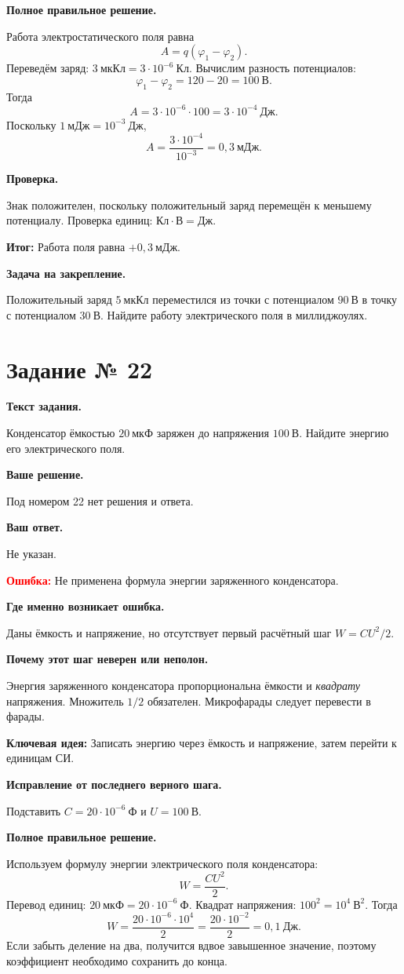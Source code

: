 \documentclass[11pt,a4paper]{article}
\newcommand{\reviewblock}[2]{\par\medskip\noindent\textbf{#1}\par\noindent#2\par}
\newcommand{\errorblock}[1]{\par\medskip\noindent\textcolor{red}{\textbf{Ошибка:}} #1\par}
\newcommand{\ideablock}[1]{\par\medskip\noindent\textcolor{blue!60!black}{\textbf{Ключевая идея:}} #1\par}
\newcommand{\resultblock}[1]{\par\medskip\noindent\textcolor{teal!60!black}{\textbf{Итог:}} #1\par}
\begin{document}
\reviewblock{Полное правильное решение.}{Работа электростатического поля равна
\[A=q(\varphi_1-\varphi_2).\]
Переведём заряд: $3\ \text{мкКл}=3\cdot10^{-6}\ \text{Кл}$. Вычислим разность потенциалов:
\[\varphi_1-\varphi_2=120-20=100\ \text{В}.\]
Тогда
\[A=3\cdot10^{-6}\cdot100=3\cdot10^{-4}\ \text{Дж}.\]
Поскольку $1\ \text{мДж}=10^{-3}\ \text{Дж}$,
\[A=\frac{3\cdot10^{-4}}{10^{-3}}=0{,}3\ \text{мДж}.\]}

\reviewblock{Проверка.}{Знак положителен, поскольку положительный заряд перемещён к меньшему потенциалу. Проверка единиц: $\text{Кл}\cdot\text{В}=\text{Дж}$.}

\resultblock{Работа поля равна $+0{,}3\ \text{мДж}$.}

\reviewblock{Задача на закрепление.}{Положительный заряд $5\ \text{мкКл}$ переместился из точки с потенциалом $90\ \text{В}$ в точку с потенциалом $30\ \text{В}$. Найдите работу электрического поля в миллиджоулях.}
\newpage
{}\label{task:22}

\section*{Задание № 22}

\reviewblock{Текст задания.}{Конденсатор ёмкостью $20\ \text{мкФ}$ заряжен до напряжения $100\ \text{В}$. Найдите энергию его электрического поля.}

\reviewblock{Ваше решение.}{Под номером 22 нет решения и ответа.}

\reviewblock{Ваш ответ.}{Не указан.}

\errorblock{Не применена формула энергии заряженного конденсатора.}

\reviewblock{Где именно возникает ошибка.}{Даны ёмкость и напряжение, но отсутствует первый расчётный шаг $W=CU^2/2$.}

\reviewblock{Почему этот шаг неверен или неполон.}{Энергия заряженного конденсатора пропорциональна ёмкости и \emph{квадрату} напряжения. Множитель $1/2$ обязателен. Микрофарады следует перевести в фарады.}

\ideablock{Записать энергию через ёмкость и напряжение, затем перейти к единицам СИ.}

\reviewblock{Исправление от последнего верного шага.}{Подставить $C=20\cdot10^{-6}\ \text{Ф}$ и $U=100\ \text{В}$.}

\reviewblock{Полное правильное решение.}{Используем формулу энергии электрического поля конденсатора:
\[W=\frac{CU^2}{2}.\]
Перевод единиц: $20\ \text{мкФ}=20\cdot10^{-6}\ \text{Ф}$. Квадрат напряжения: $100^2=10^4\ \text{В}^2$. Тогда
\[W=\frac{20\cdot10^{-6}\cdot10^4}{2}=\frac{20\cdot10^{-2}}2=0{,}1\ \text{Дж}.\]
Если забыть деление на два, получится вдвое завышенное значение, поэтому коэффициент необходимо сохранить до конца.}
\end{document}
